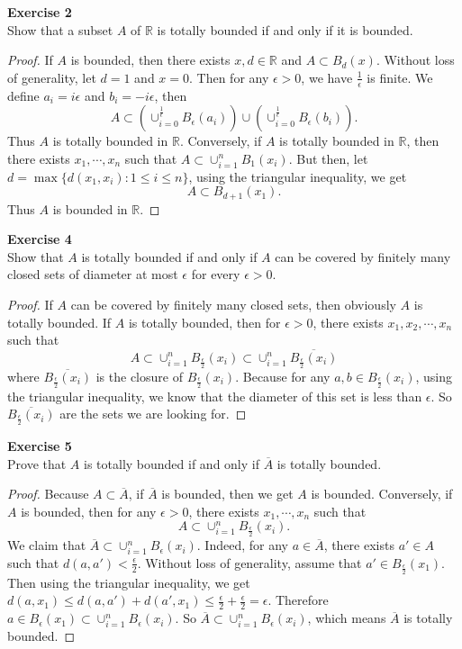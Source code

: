 \documentclass[12pt, a4paper]{article}
\theoremstyle{plain}
\newcommand{\R}{\mathbb{R}}
\newenvironment{exercise}[2][Exercise]
    { \begin{mdframed}[backgroundcolor=gray!20] \textbf{#1 #2} \\}
    {  \end{mdframed}}
\begin{document}
\begin{exercise}{2}
Show that a subset $A$ of $\R$ is totally bounded if and only if it is bounded.
\end{exercise}
	\begin{proof}
	If $A$ is bounded, then there exists $x,d\in\R$ and $A\subset B_d(x)$. Without loss of generality, let $d=1$ and $x=0$. Then for any $\epsilon>0$, we have $\frac{1}{\epsilon}$ is finite. We define $a_i=i\epsilon$ and $b_i=-i\epsilon$, then 
	\[
	A\subset \left( \cup_{i=0}^\frac{1}{\epsilon}{B_\epsilon(a_i)} \right)\cup\left(\cup_{i=0}^\frac{1}{\epsilon}B_\epsilon(b_i)\right).
	\] 
	Thus $A$ is totally bounded in $\R$. Conversely, if $A$ is totally bounded in $\R$, then there exists $x_1,\cdots,x_n$ such that $A\subset \cup_{i=1}^n{B_1(x_i)}$. But then, let $d=\max\{d(x_1,x_i):1\leq i\leq n\}$, using the triangular inequality, we get 
	\[
	A\subset B_{d+1}(x_1).
	\]
	Thus $A$ is bounded in $\R$.
	\end{proof}
	
\begin{exercise}{4}
Show that $A$ is totally bounded if and only if $A$ can be covered by finitely many closed sets of diameter at most $\epsilon$ for every $\epsilon>0$.
\end{exercise}
	\begin{proof}
	If $A$ can be covered by finitely many closed sets, then obviously $A$ is totally bounded. If $A$ is totally bounded, then for $\epsilon>0$, there exists $x_1,x_2,\cdots,x_n$ such that 
	\[
	A\subset \cup_{i=1}^n B_\frac{\epsilon}{2}(x_i)\subset \cup_{i=1}^n \overline{B_\frac{\epsilon}{2}(x_i)}
	\]
	where $\overline{B_\frac{\epsilon}{2}(x_i)}$ is the closure of $B_\frac{\epsilon}{2}(x_i)$. Because for any $a,b\in B_\frac{\epsilon}{2}(x_i)$, using the triangular inequality, we know that the diameter of this set is less than $\epsilon$. So $ \overline{B_\frac{\epsilon}{2}(x_i)}$ are the sets we are looking for.
	\end{proof}

\begin{exercise}{5}
Prove that $A$ is totally bounded if and only if $\overline{A}$ is totally bounded.
\end{exercise}
	\begin{proof}
	Because $A\subset \overline{A}$, if $\overline{A}$ is bounded, then we get $A$ is bounded. Conversely, if $A$ is bounded, then for any $\epsilon>0$, there exists $x_1,\cdots,x_n$ such that 
	\[
	A\subset \cup_{i=1}^n{B_\frac{\epsilon}{2}(x_i)}.
	\]
	We claim that $\overline{A}\subset \cup_{i=1}^n{B_\epsilon(x_i)}$. Indeed, for any $a\in \overline{A}$, there exists $a'\in A$ such that $d(a,a')<\frac{\epsilon}{2}$. Without loss of generality, assume that $a'\in B_\frac{\epsilon}{2}(x_1)$. Then using the triangular inequality, we get $d(a,x_1)\leq d(a,a')+d(a',x_1)\leq \frac{\epsilon}{2}+\frac{\epsilon}{2}=\epsilon$. Therefore $a\in B_\epsilon(x_1)\subset \cup_{i=1}^n{B_\epsilon(x_i)}$. So $\overline{A}\subset \cup_{i=1}^n{B_\epsilon(x_i)}$, which means $\overline{A}$ is totally bounded.
	\end{proof}
\end{document}
